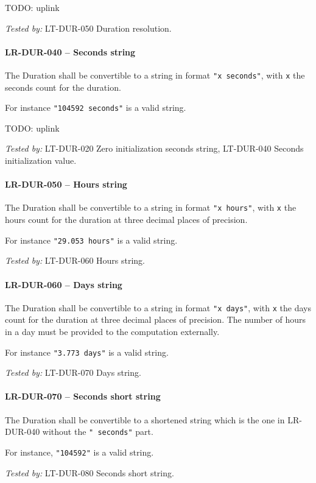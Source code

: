 TODO: uplink

\textit{Tested by: } LT-DUR-050 Duration resolution.

\paragraph{LR-DUR-040 -- Seconds string}
The Duration shall be convertible to a string in format
\lstinline{"x seconds"}, with \lstinline{x} the seconds count
for the duration.

For instance \lstinline{"104592 seconds"} is a valid string.

TODO: uplink

\textit{Tested by: } LT-DUR-020 Zero initialization seconds string,
LT-DUR-040 Seconds initialization value.

\paragraph{LR-DUR-050 -- Hours string}
The Duration shall be convertible to a string in format
\lstinline{"x hours"}, with \lstinline{x} the hours count
for the duration at three decimal places of precision.

For instance \lstinline{"29.053 hours"} is a valid string.

\textit{Tested by: } LT-DUR-060 Hours string.

\paragraph{LR-DUR-060 -- Days string}
The Duration shall be convertible to a string in format
\lstinline{"x days"}, with \lstinline{x} the days count
for the duration at three decimal places of precision.
The number of hours in a day must be provided to the
computation externally.

For instance \lstinline{"3.773 days"} is a valid string.

\textit{Tested by: } LT-DUR-070 Days string.

\paragraph{LR-DUR-070 -- Seconds short string}
The Duration shall be convertible to a shortened string which
is the one in LR-DUR-040 without the \lstinline{" seconds"}
part.

For instance, \lstinline{"104592"} is a valid string.

\textit{Tested by: } LT-DUR-080 Seconds short string.

